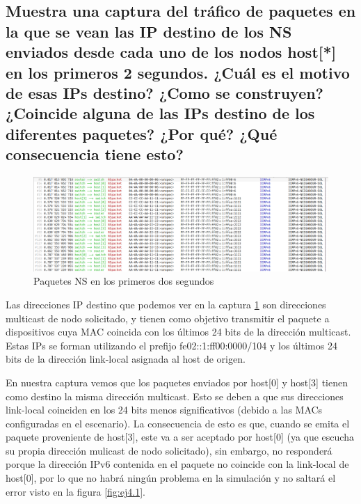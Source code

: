 \subsection{Muestra una captura del tráfico de paquetes en la que se vean las IP destino de los NS enviados desde cada uno de los nodos host[*] en los primeros 2 segundos. ¿Cuál es el motivo de esas IPs destino? ¿Como se construyen? ¿Coincide alguna de las IPs destino de los diferentes paquetes? ¿Por qué? ¿Qué consecuencia tiene esto?}

\begin{figure}[h]
    \centering
    \includegraphics[width=\textwidth]{img/ej6.1.png}
    \caption{Paquetes NS en los primeros dos segundos}
    \label{fig:ej6.1}
\end{figure}
\begin{flushleft}
   Las direcciones IP destino que podemos ver en la captura \ref{fig:ej6.1} son direcciones multicast de nodo solicitado, y tienen como objetivo transmitir el paquete a dispositivos cuya MAC coincida con los últimos 24 bits de la dirección multicast. Estas IPs se forman utilizando el prefijo fe02::1:ff00:0000/104 y los últimos 24 bits de la dirección link-local asignada al host de origen.

En nuestra captura vemos que los paquetes enviados por host[0] y host[3] tienen como destino la misma dirección multicast. Esto se deben a que sus direcciones link-local coinciden en los 24 bits menos significativos (debido a las MACs configuradas en el escenario). La consecuencia de esto es que, cuando se emita el paquete proveniente de host[3], este va a ser aceptado por host[0] (ya que escucha su propia dirección mulicast de nodo solicitado), sin embargo, no responderá porque la dirección IPv6 contenida en el paquete no coincide con la link-local de host[0], por lo que no habrá ningún problema en la simulación y no saltará el error visto en la figura \ref{fig:ej4.1}. 
\end{flushleft}

